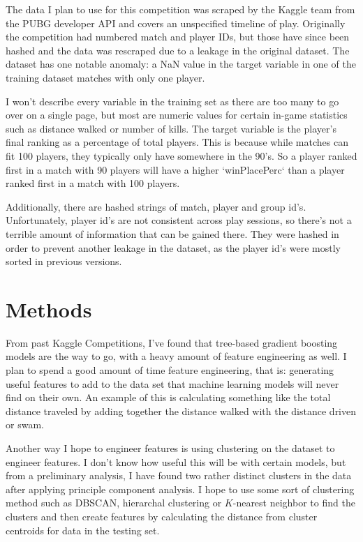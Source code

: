 \documentclass[11pt]{article}
\begin{document}
The data I plan to use for this competition was scraped by the Kaggle team from the PUBG developer
API and covers an unspecified timeline of play. Originally the competition had numbered match and
player IDs, but those have since been hashed and the data was rescraped due to a leakage in the
original dataset.\cite{competition_relaunch} The dataset has one notable anomaly: a NaN value in the
target variable in one of the training dataset matches with only one player.\cite{nan_in_training}

I won't describe every variable in the training set as there are too many to go over on a single
page, but most are numeric values for certain in-game statistics such as distance walked or number
of kills. The target variable is the player's final ranking as a percentage of total players. This
is because while matches can fit 100 players, they typically only have somewhere in the 90's. So a
player ranked first in a match with 90 players will have a higher `winPlacePerc` than a player
ranked first in a match with 100 players.

Additionally, there are hashed strings of match, player and group id's. Unfortunately, player id's
are not consistent across play sessions, so there's not a terrible amount of information that can be
gained there. They were hashed in order to prevent another leakage in the dataset, as the player
id's were mostly sorted in previous versions.\cite{competition_relaunch}

\section{Methods}

From past Kaggle Competitions, I've found that tree-based gradient boosting models are the way to 
go, with a heavy amount of feature engineering as well. I plan to spend a good amount of time 
feature engineering, that is: generating useful features to add to the data set that machine 
learning models will never find on their own. An example of this is calculating something like the 
total distance traveled by adding together the distance walked with the distance driven or 
swam.\cite{lepelaars}

Another way I hope to engineer features is using clustering on the dataset to engineer features. I 
don't know how useful this will be with certain models, but from a preliminary analysis, I have 
found two rather distinct clusters in the data after applying principle component 
analysis.\cite{clustering} I hope to use some sort of clustering method such as DBSCAN, hierarchal 
clustering or $K$-nearest neighbor to find the clusters and then create features by calculating the
distance from cluster centroids for data in the testing set.
\end{document}
